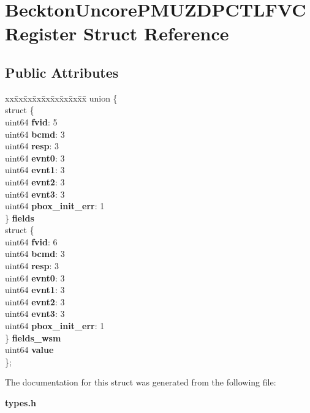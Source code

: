 \section{Beckton\+Uncore\+P\+M\+U\+Z\+D\+P\+C\+T\+L\+F\+V\+C\+Register Struct Reference}
\label{structBecktonUncorePMUZDPCTLFVCRegister}
\subsection*{Public Attributes}
\begin{DoxyCompactItemize}
\item 
\begin{tabbing}
xx\=xx\=xx\=xx\=xx\=xx\=xx\=xx\=xx\=\kill
union \{\\
\>struct \{\\
\>\>uint64 {\bfseries fvid}: 5\\
\>\>uint64 {\bfseries bcmd}: 3\\
\>\>uint64 {\bfseries resp}: 3\\
\>\>uint64 {\bfseries evnt0}: 3\\
\>\>uint64 {\bfseries evnt1}: 3\\
\>\>uint64 {\bfseries evnt2}: 3\\
\>\>uint64 {\bfseries evnt3}: 3\\
\>\>uint64 {\bfseries pbox\_init\_err}: 1\\
\>\} {\bfseries fields}\\
\>struct \{\\
\>\>uint64 {\bfseries fvid}: 6\\
\>\>uint64 {\bfseries bcmd}: 3\\
\>\>uint64 {\bfseries resp}: 3\\
\>\>uint64 {\bfseries evnt0}: 3\\
\>\>uint64 {\bfseries evnt1}: 3\\
\>\>uint64 {\bfseries evnt2}: 3\\
\>\>uint64 {\bfseries evnt3}: 3\\
\>\>uint64 {\bfseries pbox\_init\_err}: 1\\
\>\} {\bfseries fields\_wsm}\\
\>uint64 {\bfseries value}\\
\}; \label{structBecktonUncorePMUZDPCTLFVCRegister_a92490cac0cda82bb90103a7f347cbfae}
\\

\end{tabbing}\end{DoxyCompactItemize}


The documentation for this struct was generated from the following file\+:\begin{DoxyCompactItemize}
\item 
{\bf types.\+h}\end{DoxyCompactItemize}
